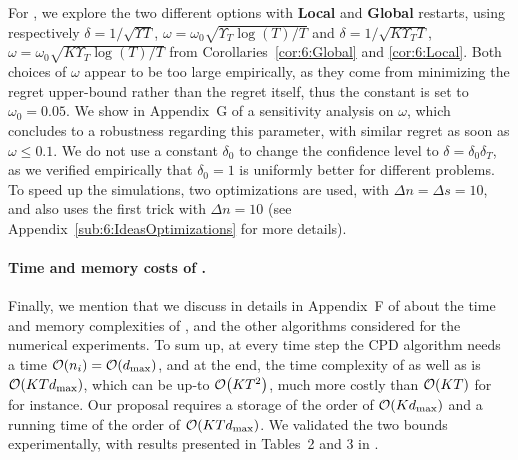 
For \GLRklUCB, we explore the two different options with \textbf{Local} and \textbf{Global} restarts,
using respectively
$\delta = 1/\sqrt{\Upsilon T}$, $\omega = \omega_0 \sqrt{\Upsilon_T \log(T) /T}$
and
$\delta = 1/\sqrt{K \Upsilon_T T}$, $\omega = \omega_0\sqrt{K \Upsilon_T \log(T) / T}$
from Corollaries~\ref{cor:6:Global} and \ref{cor:6:Local}.
Both choices of $\omega$ appear to be too large empirically, as they come from minimizing the regret upper-bound rather than the regret itself, thus
the constant is set to $\omega_0 = 0.05$.
We show in Appendix~G of \cite{Besson2019GLRT} a sensitivity analysis on $\omega$,
which concludes to a robustness regarding this parameter, with similar regret as soon as $\omega\leq0.1$.
We do not use a constant $\delta_0$ to change the confidence level to $\delta = \delta_0 \delta_T$, as we
verified empirically
that $\delta_0=1$ is uniformly better for different problems.
%
To speed up the simulations, two optimizations are used, with $\Delta n = \Delta s = 10$,
and \CUSUM{} also uses the first trick with $\Delta n = 10$ (see Appendix~\ref{sub:6:IdeasOptimizations} for more details).


\paragraph{Time and memory costs of \GLRklUCB.}
%
Finally, we mention that we discuss in details in Appendix~F of \cite{Besson2019GLRT} about the time and memory complexities of \GLRklUCB, and the other algorithms considered for the numerical experiments.
%
To sum up, at every time step the CPD algorithm needs a time $\mathop{}\mathopen{}\mathcal{O}\mathopen{}\left(n_i\right)=\mathop{}\mathopen{}\mathcal{O}\mathopen{}\left(d_{\max}\right)$, and at the end, the time complexity of \CUSUMklUCB{} as well as \GLRklUCB{} is $\mathop{}\mathopen{}\mathcal{O}\mathopen{}\left(K T d_{\max}\right)$, which can be up-to $\mathop{}\mathopen{}\mathcal{O}\mathopen{}\left(K T^2\right)$, much more costly than $\mathop{}\mathopen{}\mathcal{O}\mathopen{}\left(K T\right)$ for \klUCB{} for instance.
%
Our proposal \GLRklUCB{} requires a storage of the order of $\mathop{}\mathopen{}\mathcal{O}\mathopen{}\left(K d_{\max}\right)$ and a running time of the order of $\mathop{}\mathopen{}\mathcal{O}\mathopen{}\left(K T d_{\max}\right)$.
We validated the two bounds experimentally, with results presented in Tables~2 and 3 in \cite{Besson2019GLRT}.


%


